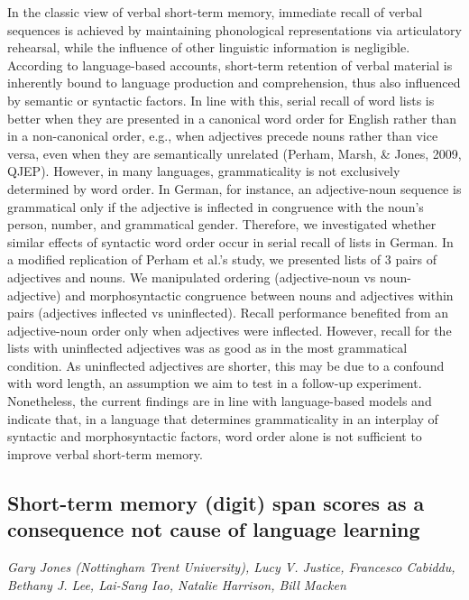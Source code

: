 \documentclass[12pt,]{book}
\begin{document}
In the classic view of verbal short-term memory, immediate recall of verbal sequences is achieved by maintaining phonological representations via articulatory rehearsal, while the influence of other linguistic information is negligible. According to language-based accounts, short-term retention of verbal material is inherently bound to language production and comprehension, thus also influenced by semantic or syntactic factors. In line with this, serial recall of word lists is better when they are presented in a canonical word order for English rather than in a non-canonical order, e.g., when adjectives precede nouns rather than vice versa, even when they are semantically unrelated (Perham, Marsh, \& Jones, 2009, QJEP). However, in many languages, grammaticality is not exclusively determined by word order. In German, for instance, an adjective-noun sequence is grammatical only if the adjective is inflected in congruence with the noun's person, number, and grammatical gender. Therefore, we investigated whether similar effects of syntactic word order occur in serial recall of lists in German. In a modified replication of Perham et al.'s study, we presented lists of 3 pairs of adjectives and nouns. We manipulated ordering (adjective-noun vs noun-adjective) and morphosyntactic congruence between nouns and adjectives within pairs (adjectives inflected vs uninflected). Recall performance benefited from an adjective-noun order only when adjectives were inflected. However, recall for the lists with uninflected adjectives was as good as in the most grammatical condition. As uninflected adjectives are shorter, this may be due to a confound with word length, an assumption we aim to test in a follow-up experiment. Nonetheless, the current findings are in line with language-based models and indicate that, in a language that determines grammaticality in an interplay of syntactic and morphosyntactic factors, word order alone is not sufficient to improve verbal short-term memory.

\hypertarget{short-term-memory-digit-span-scores-as-a-consequence-not-cause-of-language-learning}{%
\subsection{Short-term memory (digit) span scores as a consequence not cause of language learning}\label{short-term-memory-digit-span-scores-as-a-consequence-not-cause-of-language-learning}}

\emph{Gary Jones (Nottingham Trent University), Lucy V. Justice, Francesco Cabiddu, Bethany J. Lee, Lai-Sang Iao, Natalie Harrison, Bill Macken}
\end{document}
